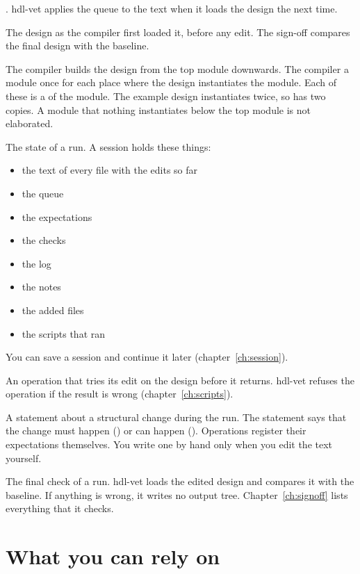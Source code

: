 \begin{description}
  . hdl-vet applies the queue to the text when it loads the design the
  next time.
\item[baseline] The design as the compiler first loaded it, before any edit. The
  sign-off compares the final design with the baseline.
\item[elaborated, copy] The compiler builds the design from the top module
  downwards. The compiler  a module once for each place where the
  design instantiates the module. Each of these is a  of the module.
  The example design instantiates  twice, so  has two copies.
  A module that nothing instantiates below the top module is not elaborated.
\item[session] The state of a run. A session holds these things:
  \begin{itemize}
  \item the text of every file with the edits so far
  \item the queue
  \item the expectations
  \item the checks
  \item the log
  \item the notes
  \item the added files
  \item the scripts that ran
  \end{itemize}
  You can save a session and continue it later (chapter~\ref{ch:session}).
\item[checked operation] An operation that tries its edit on the design before it
  returns. hdl-vet refuses the operation if the result is wrong
  (chapter~\ref{ch:scripts}).
\item[expectation] A statement about a structural change during the run. The
  statement says that the change must happen () or can happen
  (). Operations register their expectations themselves. You write one
  by hand only when you edit the text yourself.
\item[sign-off] The final check of a run. hdl-vet loads the edited design and
  compares it with the baseline. If anything is wrong, it writes no output tree.
  Chapter~\ref{ch:signoff} lists everything that it checks.
\end{description}

\section{What you can rely on}

